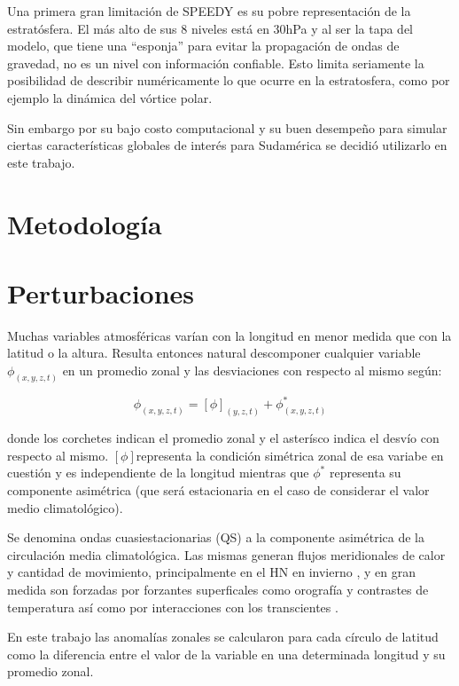 \documentclass[spanish,a4paper,12pt,oneside]{book}
\begin{document}
Una primera gran limitación de SPEEDY es su pobre representación de la
estratósfera. El más alto de sus 8 niveles está en 30hPa y al ser la
tapa del modelo, que tiene una ``esponja'' para evitar la propagación de
ondas de gravedad, no es un nivel con información confiable. Esto limita
seriamente la posibilidad de describir numéricamente lo que ocurre en la
estratosfera, como por ejemplo la dinámica del vórtice polar.

Sin embargo por su bajo costo computacional y su buen desempeño para
simular ciertas características globales de interés para Sudamérica
\autocite{Barreiro2014} se decidió utilizarlo en este trabajo.

\section{Metodología}\label{metodologia}

\section*{Perturbaciones}

Muchas variables atmosféricas varían con la longitud en menor medida que
con la latitud o la altura. Resulta entonces natural descomponer
cualquier variable \(\phi_{(x, y, z, t)}\) en un promedio zonal y las
desviaciones con respecto al mismo según:

\[
\phi_{(x, y, z, t)} = [\phi]_{(y, z, t)} + \phi_{(x, y, z, t)}^*
\]

donde los corchetes indican el promedio zonal y el asterísco indica el
desvío con respecto al mismo. \([\phi]\)representa la condición
simétrica zonal de esa variabe en cuestión y es independiente de la
longitud mientras que \(\phi^*\) representa su componente asimétrica
(que será estacionaria en el caso de considerar el valor medio
climatológico).

Se denomina ondas cuasiestacionarias (QS) a la componente asimétrica de
la circulación media climatológica. Las mismas generan flujos
meridionales de calor y cantidad de movimiento, principalmente en el HN
en invierno \autocite{James}, y en gran medida son forzadas por
forzantes superficales como orografía y contrastes de temperatura así
como por interacciones con los transcientes \autocite{Rao2004}.

En este trabajo las anomalías zonales se calcularon para cada círculo de
latitud como la diferencia entre el valor de la variable en una
determinada longitud y su promedio zonal.
\end{document}
